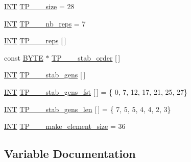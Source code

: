 \begin{DoxyCompactItemize}
\item 
\mbox{\hyperlink{galois_8h_a09fddde158a3a20bd2dcadb609de11dc}{I\+NT}} \mbox{\hyperlink{data___t_p_8_c_ab291acc74db90be1312d8d2599c3f6da}{T\+P\+\_\+\_\+\_\+size}} = 28
\item 
\mbox{\hyperlink{galois_8h_a09fddde158a3a20bd2dcadb609de11dc}{I\+NT}} \mbox{\hyperlink{data___t_p_8_c_af77231b8e5cb353aceb2d0f564e9f688}{T\+P\+\_\+\_\+\_\+nb\+\_\+reps}} = 7
\item 
\mbox{\hyperlink{galois_8h_a09fddde158a3a20bd2dcadb609de11dc}{I\+NT}} \mbox{\hyperlink{data___t_p_8_c_aaad2ea58a0be1f1251dda2a7f36f0252}{T\+P\+\_\+\_\+\_\+reps}} \mbox{[}$\,$\mbox{]}
\item 
const \mbox{\hyperlink{galois_8h_ab6cc7b4aeb6ea31aba2b3fbfc83ff5e6}{B\+Y\+TE}} $\ast$ \mbox{\hyperlink{data___t_p_8_c_aab42de0b63d72abfad2366b16dd3ee8c}{T\+P\+\_\+\_\+\_\+stab\+\_\+order}} \mbox{[}$\,$\mbox{]}
\item 
\mbox{\hyperlink{galois_8h_a09fddde158a3a20bd2dcadb609de11dc}{I\+NT}} \mbox{\hyperlink{data___t_p_8_c_a17b60747aca0b7247865c05da29bba34}{T\+P\+\_\+\_\+\_\+stab\+\_\+gens}} \mbox{[}$\,$\mbox{]}
\item 
\mbox{\hyperlink{galois_8h_a09fddde158a3a20bd2dcadb609de11dc}{I\+NT}} \mbox{\hyperlink{data___t_p_8_c_a8b5230e07df51bd4f04f2ed8c7af0688}{T\+P\+\_\+\_\+\_\+stab\+\_\+gens\+\_\+fst}} \mbox{[}$\,$\mbox{]} = \{ 0, 7, 12, 17, 21, 25, 27\}
\item 
\mbox{\hyperlink{galois_8h_a09fddde158a3a20bd2dcadb609de11dc}{I\+NT}} \mbox{\hyperlink{data___t_p_8_c_aaf7c3907e067e91a539a4e2bb5bab9e3}{T\+P\+\_\+\_\+\_\+stab\+\_\+gens\+\_\+len}} \mbox{[}$\,$\mbox{]} = \{ 7, 5, 5, 4, 4, 2, 3\}
\item 
\mbox{\hyperlink{galois_8h_a09fddde158a3a20bd2dcadb609de11dc}{I\+NT}} \mbox{\hyperlink{data___t_p_8_c_a5155f38c4fd2c9ac216e5b6bc7be5e0b}{T\+P\+\_\+\_\+\_\+make\+\_\+element\+\_\+size}} = 36
\end{DoxyCompactItemize}


\subsection{Variable Documentation}
\mbox{\label{data___t_p_8_c_aaf090b097442268f42fb61ad012082e3}} 
